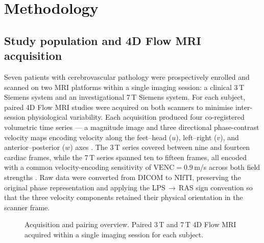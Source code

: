
\section*{Methodology}

\subsection*{Study population and 4D Flow MRI acquisition}

Seven patients with cerebrovascular pathology were prospectively
enrolled and scanned on two MRI platforms within a single imaging
session: a clinical 3\,T Siemens system and an investigational 7\,T
Siemens system. For each subject, paired 4D Flow MRI studies were
acquired on both scanners to minimise inter-session physiological
variability. Each acquisition produced four co-registered volumetric
time series --- a magnitude image and three directional phase-contrast
velocity maps encoding velocity along the feet--head ($u$),
left--right ($v$), and anterior--posterior ($w$) axes
\cite{markl2012,dyverfeldt2015}. The 3\,T series covered between nine
and fourteen cardiac frames, while the 7\,T series spanned ten to
fifteen frames, all encoded with a common velocity-encoding sensitivity
of $\mathrm{VENC} = 0.9$\,\textnormal{m/s} across both field strengths
\cite{bock2010}. Raw data were converted from DICOM to NIfTI, preserving
the original phase representation and applying the LPS\,$\rightarrow$\,RAS
sign convention so that the three velocity components retained their
physical orientation in the scanner frame.

\begin{figure}[!htbp]
    \centering
    \caption{Acquisition and pairing overview. Paired 3\,T and 7\,T 4D
    Flow MRI acquired within a single imaging session for each subject.}
    \label{fig:acquisition}
\end{figure}

